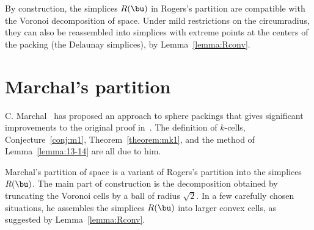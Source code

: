 By construction, the simplices $R(\bu)$ in Rogers's partition are
compatible with the Voronoi decomposition of space.  Under mild
restrictions on the circumradius, they can also be reassembled into
simplices with extreme points at the centers of the packing (the Delaunay
simplices), by Lemma~\ref{lemma:Rconv}.
%
%



\section{Marchal's partition}

C. Marchal~\cite{marchal:2008} has proposed an approach to sphere packings
 that gives significant improvements to the original proof
in~\cite{Hales:2006:DCG}.  The definition of $k$-cells,
Conjecture~\ref{conj:m1}, Theorem~\ref{theorem:mk1}, and the method of
Lemma~\ref{lemma:13-14} are all due to him.  
%


Marchal's partition of space is a variant of Rogers's partition into
the simplices $R(\bu)$.  The main part of construction is the
decomposition obtained by truncating the Voronoi cells by a ball of
radius $\sqrt2$.  In a few carefully chosen situations, he assembles
the simplices $R(\bu)$ into larger convex cells, as suggested by
Lemma~\ref{lemma:Rconv}.




